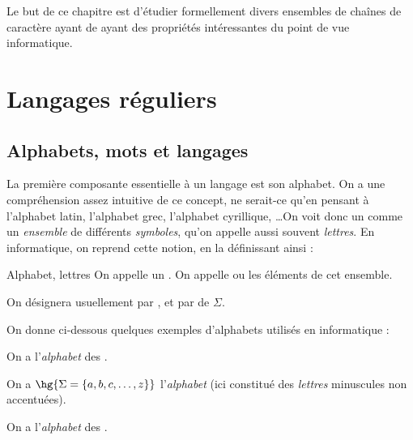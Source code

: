     Le but de ce chapitre est d'étudier formellement divers ensembles de chaînes de caractère ayant de ayant des propriétés intéressantes du point de vue informatique.
    
    \chaptertoc
    
    \section{Langages réguliers}
    
    \subsection{Alphabets, mots et langages}
    
    La première composante essentielle à un langage est son alphabet. On a une compréhension assez intuitive de ce concept, ne serait-ce qu'en pensant à l'alphabet latin, l'alphabet grec, l'alphabet cyrillique, \dots On voit donc un  comme un \textit{ensemble} de différents \textit{symboles}, qu'on appelle aussi souvent \textit{lettres}. En informatique, on reprend cette notion, en la définissant ainsi :
        
    \begin{definition}{Alphabet, lettres}{}
        On appelle  un . On appelle  ou  les éléments de cet ensemble.
    \end{definition}
    \begin{notation}
        On désignera usuellement par , et par  de $\Sigma$.
    \end{notation}
    
    On donne ci-dessous quelques exemples d'alphabets utilisés en informatique :
    
    \begin{example}{}{}
        \begin{enumerate}
            \itt On a  l'\textit{alphabet} des .
            
            \itt On a $\hg{\Sigma = \ens{a, b, c, \dots, z}}$ l'\textit{alphabet}  (ici constitué des \textit{lettres} minuscules non accentuées).
            
            \itt On a l'\textit{alphabet} des .
        \end{enumerate}
    \end{example}
    

